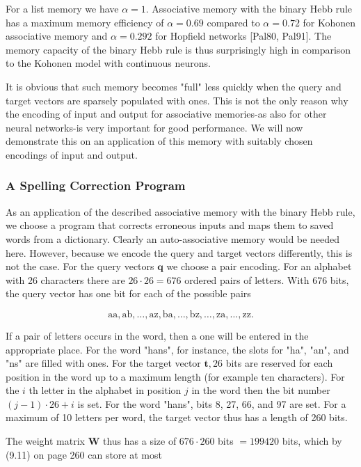 \documentclass[10pt]{article}
\begin{document}
For a list memory we have $\alpha=1$. Associative memory with the binary Hebb rule has a maximum memory efficiency of $\alpha=0.69$ compared to $\alpha=0.72$ for Kohonen associative memory and $\alpha=0.292$ for Hopfield networks [Pal80, Pal91]. The memory capacity of the binary Hebb rule is thus surprisingly high in comparison to the Kohonen model with continuous neurons.

It is obvious that such memory becomes "full" less quickly when the query and target vectors are sparsely populated with ones. This is not the only reason why the encoding of input and output for associative memories-as also for other neural networks-is very important for good performance. We will now demonstrate this on an application of this memory with suitably chosen encodings of input and output.

\subsubsection*{A Spelling Correction Program}
As an application of the described associative memory with the binary Hebb rule, we choose a program that corrects erroneous inputs and maps them to saved words from a dictionary. Clearly an auto-associative memory would be needed here. However, because we encode the query and target vectors differently, this is not the case. For the query vectors $\boldsymbol{q}$ we choose a pair encoding. For an alphabet with 26 characters there are $26 \cdot 26=676$ ordered pairs of letters. With 676 bits, the query vector has one bit for each of the possible pairs

$$
\mathrm{aa}, \mathrm{ab}, \ldots, \mathrm{az}, \mathrm{ba}, \ldots, \mathrm{bz}, \ldots, \mathrm{za}, \ldots, \mathrm{zz} .
$$

If a pair of letters occurs in the word, then a one will be entered in the appropriate place. For the word "hans", for instance, the slots for "ha", "an", and "ns" are filled with ones. For the target vector $\boldsymbol{t}, 26$ bits are reserved for each position in the word up to a maximum length (for example ten characters). For the $i$ th letter in the alphabet in position $j$ in the word then the bit number $(j-1) \cdot 26+i$ is set. For the word "hans", bits 8, 27, 66, and 97 are set. For a maximum of 10 letters per word, the target vector thus has a length of 260 bits.

The weight matrix $\boldsymbol{W}$ thus has a size of $676 \cdot 260$ bits $=199420$ bits, which by (9.11) on page 260 can store at most
\end{document}
